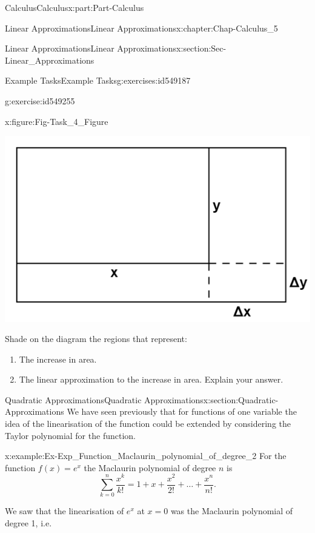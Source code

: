 \documentclass[oneside,10pt,]{book}
\numberwithin{equation}{section}
\begin{document}
\begin{partptx}{Calculus}{}{Calculus}{}{}{x:part:Part-Calculus}
\begin{chapterptx}{Linear Approximations}{}{Linear Approximations}{}{}{x:chapter:Chap-Calculus_5}
\begin{sectionptx}{Linear Approximations}{}{Linear Approximations}{}{}{x:section:Sec-Linear_Approximations}
\begin{exercises-subsection-numberless}{Example Tasks}{}{Example Tasks}{}{}{g:exercises:id549187}
\begin{divisionexercise}{4}{}{}{g:exercise:id549255}
\begin{figureptx}{}{x:figure:Fig-Task_4_Figure}{}
\begin{image}{0.2}{0.6}{0.2}
\includegraphics[width=\linewidth]{./Calculus/Images/5/Task_4_Figure.png}
\end{image}%
\tcblower
\end{figureptx}%
 Shade on the diagram the regions that represent:%
\begin{enumerate}[label=\alph*]
\item{}The increase in area.%
\item{}The linear approximation to the increase in area. Explain your answer.%
\end{enumerate}
%
\end{divisionexercise}%
\end{exercises-subsection-numberless}
\end{sectionptx}
%
%
\typeout{************************************************}
\typeout{************************************************}
%
\begin{sectionptx}{Quadratic Approximations}{}{Quadratic Approximations}{}{}{x:section:Quadratic-Approximations}
We have seen previously that for functions of one variable the idea of the linearisation of the function could be extended by considering the Taylor polynomial for the function.%
\begin{example}{}{x:example:Ex-Exp_Function_Maclaurin_polynomial_of_degree_2}%
For the function \(f(x) = e^x\) the Maclaurin polynomial of degree \(n\) is%
\begin{equation*}
\sum_{k=0}^{n} \dfrac{x^k}{k!} = 1+x+\dfrac{x^2}{2!}+\ldots+\dfrac{x^n}{n!}\text{.}
\end{equation*}
%
\par
We saw that the linearisation of \(e^x\) at \(x=0\) was the Maclaurin polynomial of degree 1, i.e.%
\begin{equation*}

\end{equation*}
\end{example}
\end{sectionptx}
\end{chapterptx}
\end{partptx}
\end{document}
